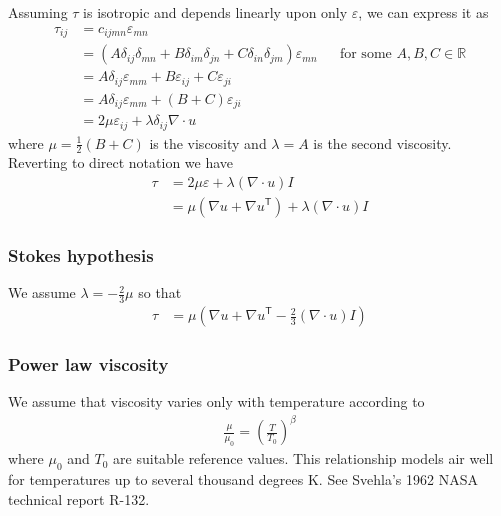 \documentclass[letterpaper,11pt,nointlimits]{amsart}
\newcommand{\trans}[1]{{#1}^{\ensuremath{\mathsf{T}}}}
\begin{document}
Assuming $\tau$ is isotropic and depends linearly upon only $\varepsilon$,
we can express it as
\begin{align}
\tau_{ij} 
  &= c_{ijmn} \varepsilon_{mn}
  \\
  &= \left( A \delta_{ij} \delta_{mn} 
          + B \delta_{im} \delta_{jn} 
          + C \delta_{in} \delta_{jm}
     \right) \varepsilon_{mn}
  &
  &\text{for some }A, B, C\in\mathbb{R}
  \\
  &= A \delta_{ij} \varepsilon_{mm} + B\varepsilon_{ij} + C\varepsilon_{ji}
  \\
  &= A \delta_{ij} \varepsilon_{mm} + \left( B+C \right)\varepsilon_{ji}
  \\
  &= 2 \mu \varepsilon_{ij} + \lambda\delta_{ij}\nabla\cdot{}u
\end{align}
where $\mu=\frac{1}{2}\left( B + C \right)$ is the viscosity
and $\lambda=A$ is the second viscosity.
Reverting to direct notation we have
\begin{align}
\tau 
  &= 2 \mu \varepsilon + \lambda \left( \nabla\cdot{}u \right) I
  \\
\label{eq:taunewt}
&=   \mu \left( \nabla{}u + \trans{\nabla{}u} \right) 
   + \lambda \left( \nabla\cdot{}u \right) I
\end{align}

\subsubsection{Stokes hypothesis}

We assume $\lambda=-\frac{2}{3}\mu$ so that
\begin{align}
\tau &= \mu \left( 
    \nabla{}u + \trans{\nabla{}u} - \frac{2}{3} (\nabla\cdot{}u) I
  \right) 
\end{align}

\subsubsection{Power law viscosity}

We assume that viscosity varies only with temperature according to
\begin{align}
  \label{eq:powerlawviscosity}
  \frac{\mu}{\mu_{0}}=\left(\frac{T}{T_{0}}\right)^{\beta}
\end{align}
where $\mu_{0}$ and $T_{0}$ are suitable reference values.  This
relationship models air well for temperatures up to several thousand
degrees K.  See Svehla's 1962 NASA technical report R-132.
\end{document}
